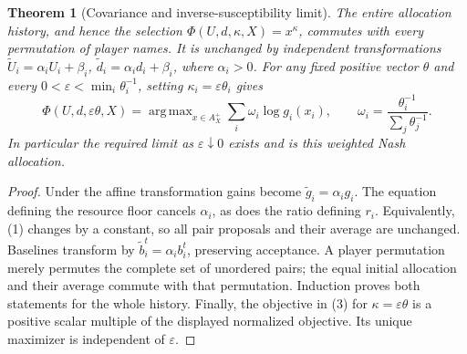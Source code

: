 \documentclass[11pt]{article}
\newtheorem{theorem}{Theorem}
\theoremstyle{remark}\newtheorem{remark}[theorem]{Remark}
\DeclareMathOperator*{\argmax}{arg\,max}
\begin{document}
\begin{theorem}[Covariance and inverse-susceptibility limit]
The entire allocation history, and hence the selection $\Phi(U,d,\kappa,X)=x^\kappa$, commutes with every permutation of player names. It is unchanged by independent transformations $\widetilde U_i=\alpha_iU_i+\beta_i$, $\widetilde d_i=\alpha_id_i+\beta_i$, where $\alpha_i>0$. For any fixed positive vector $\theta$ and every $0<\varepsilon<\min_i\theta_i^{-1}$, setting $\kappa_i=\varepsilon\theta_i$ gives
\[
 \Phi(U,d,\varepsilon\theta,X)
 =\argmax_{x\in A_X^+}\sum_i\omega_i\log g_i(x_i),
 \qquad \omega_i=\frac{\theta_i^{-1}}{\sum_j\theta_j^{-1}}.
\]
In particular the required limit as $\varepsilon\downarrow0$ exists and is this weighted Nash allocation.
\end{theorem}
\begin{proof}
Under the affine transformation gains become $\widetilde g_i=\alpha_i g_i$. The equation defining the resource floor cancels $\alpha_i$, as does the ratio defining $r_i$. Equivalently, (1) changes by a constant, so all pair proposals and their average are unchanged. Baselines transform by $\widetilde b_i^t=\alpha_i b_i^t$, preserving acceptance. A player permutation merely permutes the complete set of unordered pairs; the equal initial allocation and their average commute with that permutation. Induction proves both statements for the whole history. Finally, the objective in (3) for $\kappa=\varepsilon\theta$ is a positive scalar multiple of the displayed normalized objective. Its unique maximizer is independent of $\varepsilon$.
\end{proof}
\end{document}
